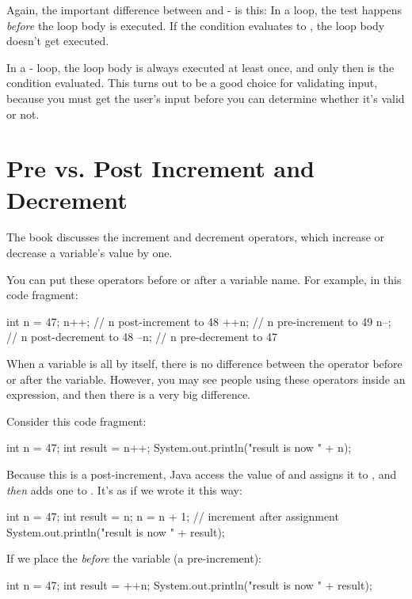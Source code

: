 Again, the important difference between  and - is this: In a  loop, the test happens {\em before} the loop body is executed. If the condition evaluates to , the loop body doesn't get executed.

In a - loop, the loop body is always executed at least once, and only then is the condition evaluated. This turns out to be a good choice for validating input, because you must get the user's input before you can determine whether it's valid or not.

\section{Pre vs. Post Increment and Decrement}

The book discusses the increment \java{++} and decrement \java{--} operators, which increase or decrease a variable's value by one.

You can put these operators before or after a variable name. For example, in this code fragment:

\begin{code}
int n = 47;
n++; // n post-increment to 48
++n; // n pre-increment to 49
n--; // n post-decrement to 48
--n; // n pre-decrement to 47
\end{code}

When a variable is all by itself, there is no difference between the operator before or after the variable. However, you may see people using these operators inside an expression, and then there is a very big difference.

Consider this code fragment:

\begin{code}
int n = 47;
int result = n++;
System.out.println("result is now " + n);
\end{code}

Because this is a post-increment, Java access the value of  and assigns it to , and {\em then} adds one to . It's as if we wrote it this way:

\begin{code}
int n = 47;
int result = n;
n = n + 1; // increment after assignment
System.out.println("result is now " + result);
\end{code}

If we place the \java{++} {\em before} the variable (a pre-increment):

\begin{code}
int n = 47;
int result = ++n;
System.out.println("result is now " + result);
\end{code}

